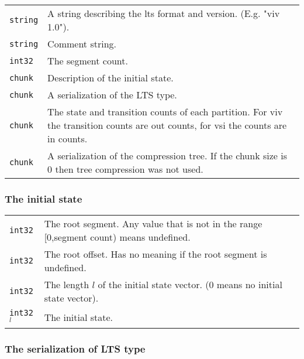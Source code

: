 \par\noindent\begin{tabularx}{\textwidth}{lX}
{\tt string} & A string describing the lts format and version. (E.g. "viv 1.0").
\\
{\tt string} & Comment string.
\\
{\tt int32} & The segment count.
\\
{\tt chunk} & Description of the initial state.
\\
{\tt chunk} & A serialization of the LTS type.
\\
{\tt chunk} & The state and transition counts of each partition. For viv the transition counts are out counts, for vsi the counts are in counts.
\\
{\tt chunk} & A serialization of the compression tree. If the chunk size is 0 then
tree compression was not used.
\end{tabularx}

\subsubsection{The initial state}

\par\noindent\begin{tabularx}{\textwidth}{lX}
{\tt int32} & The root segment. Any value that is not in the range [0,segment count) means undefined.
\\
{\tt int32} & The root offset. Has no meaning if the root segment is undefined.
\\
{\tt int32} & The length $l$ of the initial state vector. (0 means no initial state vector).
\\
{\tt int32}${}^l$ & The initial state.
\end{tabularx}


\subsubsection{The serialization of LTS type}

